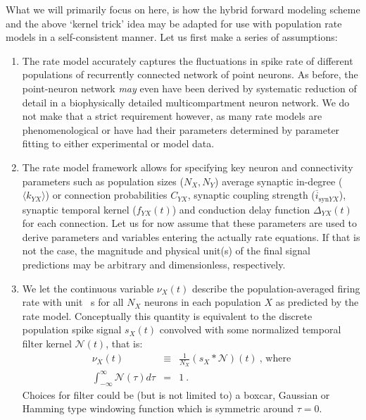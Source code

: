 What we will primarily focus on here, 
is how the hybrid forward modeling scheme and the above `kernel trick' idea may be adapted for use with population rate models in a self-consistent manner. 
Let us first make a series of assumptions:
\begin{enumerate}
\item The rate model accurately captures the fluctuations in spike rate of different populations of recurrently connected network of point neurons. 
As before, the point-neuron network \textit{may} even have been derived by systematic reduction of detail in a biophysically detailed multicompartment neuron network. 
We do not make that a strict requirement however, 
as many rate models are phenomenological or have had their parameters determined by parameter fitting to either experimental or model data. 

\item The rate model framework allows for specifying key neuron and connectivity parameters such as 
population sizes ($N_X, N_Y$) average synaptic in-degree ($\langle k_{YX} \rangle$) or connection probabilities $C_{YX}$, 
synaptic coupling strength ($\overline{i}_{\mathrm{syn}YX}$), 
synaptic temporal kernel ($f_{YX}(t)$) and
conduction delay function $\Delta_{YX}(t)$ for each connection. 
Let us for now assume that these parameters are used to derive parameters and variables entering the actually rate equations. 
If that is not the case, the magnitude and physical unit(s) of the final signal predictions may be arbitrary and dimensionless, respectively. 

\item We let the continuous variable $\nu_X(t)$ describe the population-averaged firing rate with unit \si{\per\second} for all $N_X$ neurons in each population $X$ as predicted by the rate model. 
Conceptually this quantity is equivalent to the discrete population spike signal $s_X(t)$ convolved with some normalized temporal filter kernel $\mathcal{N}(t)$, that is:
\begin{eqnarray}
\nu_X(t) &\equiv& \frac{1}{N_X} \left(s_X \ast \mathcal{N}\right)(t)~\text{, where} \\
\int_{-\infty}^\infty \mathcal{N}(\tau) d\tau &=& 1 ~.
\end{eqnarray}
Choices for filter could be (but is not limited to) a boxcar, Gaussian or Hamming type windowing function which is symmetric around $\tau = 0$.   

\end{enumerate}

